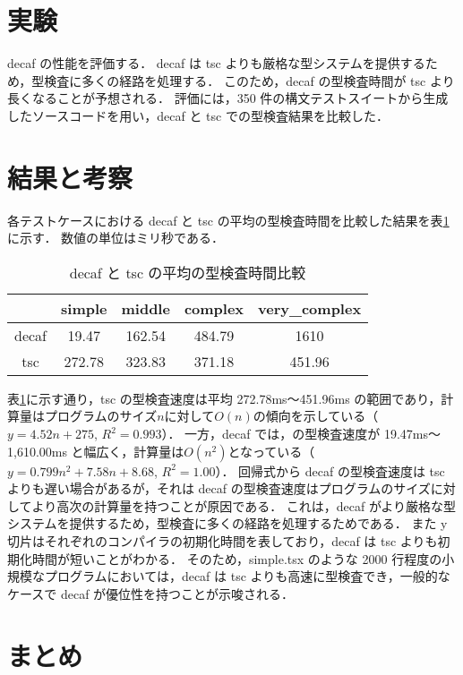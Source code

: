 \documentclass[11pt,twocolumn]{classes/yokou}
\begin{document}
\section{実験}

decaf の性能を評価する．
decaf は tsc よりも厳格な型システムを提供するため，型検査に多くの経路を処理する．
このため，decaf の型検査時間が tsc より長くなることが予想される．
評価には，350 件の構文テストスイートから生成したソースコードを用い，decaf と tsc での型検査結果を比較した．

\section{結果と考察}

各テストケースにおける decaf と tsc の平均の型検査時間を比較した結果を表\ref{tab:comparison} に示す．
数値の単位はミリ秒である．

\begin{table}[h]
	\caption{decaf と tsc の平均の型検査時間比較}
	\begin{tabular}{|c|c|c|c|c|}
		\hline
		      & simple & middle & complex & very\_complex \\ \hline
		decaf & 19.47  & 162.54 & 484.79  & 1610          \\ \hline
		tsc   & 272.78 & 323.83 & 371.18  & 451.96        \\ \hline
	\end{tabular}
	\label{tab:comparison}
\end{table}

表\ref{tab:comparison}に示す通り，tsc の型検査速度は平均 272.78ms〜451.96ms の範囲であり，計算量はプログラムのサイズ$n$に対して$O(n)$の傾向を示している（$y = 4.52n + 275$, $R^2 = 0.993$）．
一方，decaf では，の型検査速度が 19.47ms〜1,610.00ms と幅広く，計算量は$O(n^2)$となっている（$y = 0.799n^2 + 7.58n + 8.68$, $R^2 = 1.00$）．
回帰式から decaf の型検査速度は tsc よりも遅い場合があるが，それは decaf の型検査速度はプログラムのサイズに対してより高次の計算量を持つことが原因である．
これは，decaf がより厳格な型システムを提供するため，型検査に多くの経路を処理するためである．
また y 切片はそれぞれのコンパイラの初期化時間を表しており，decaf は tsc よりも初期化時間が短いことがわかる．
そのため，simple.tsx のような 2000 行程度の小規模なプログラムにおいては，decaf は tsc よりも高速に型検査でき，一般的なケースで decaf が優位性を持つことが示唆される．

\section{まとめ}
\end{document}

